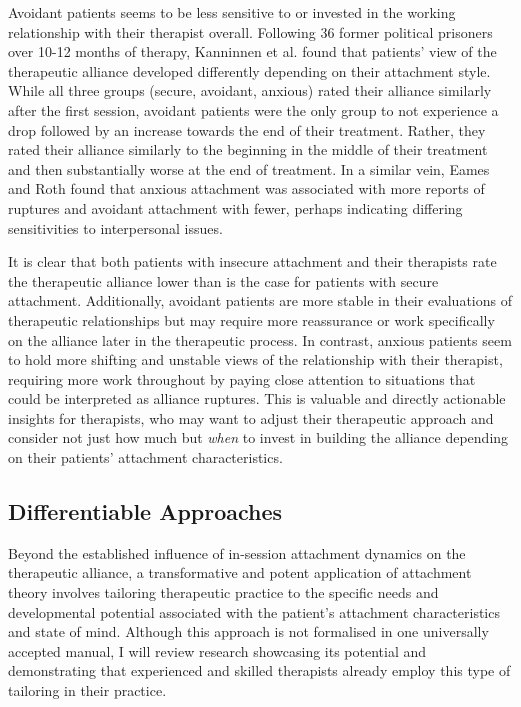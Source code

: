 \documentclass[12pt]{report}
\begin{document}
Avoidant patients seems to be less sensitive to or invested in the working relationship with their therapist overall.
Following 36 former political prisoners over 10-12 months of therapy, Kanninnen et al. \citeyear{Kanninen2000} found that patients' view of the therapeutic alliance developed differently depending on their attachment style.
While all three groups (secure, avoidant, anxious) rated their alliance similarly after the first session, avoidant patients were the only group to not experience a drop followed by an increase towards the end of their treatment.
Rather, they rated their alliance similarly to the beginning in the middle of their treatment and then substantially worse at the end of treatment.
In a similar vein, Eames and Roth \citeyear{Eames2000} found that anxious attachment was associated with more reports of ruptures and avoidant attachment with fewer, perhaps indicating differing sensitivities to interpersonal issues.

It is clear that both patients with insecure attachment and their therapists rate the therapeutic alliance lower than is the case for patients with secure attachment.
Additionally, avoidant patients are more stable in their evaluations of therapeutic relationships but may require more reassurance or work specifically on the alliance later in the therapeutic process.
In contrast, anxious patients seem to hold more shifting and unstable views of the relationship with their therapist, requiring more work throughout by paying close attention to situations that could be interpreted as alliance ruptures.
This is valuable and directly actionable insights for therapists, who may want to adjust their therapeutic approach and consider not just how much but \textit{when} to invest in building the alliance depending on their patients' attachment characteristics.

\subsection{Differentiable Approaches}
\label{sec:Differentiable approaches}
Beyond the established influence of in-session attachment dynamics on the therapeutic alliance, a transformative and potent application of attachment theory involves tailoring therapeutic practice to the specific needs and developmental potential associated with the patient's attachment characteristics and state of mind.
Although this approach is not formalised in one universally accepted manual, I will review research showcasing its potential and demonstrating that experienced and skilled therapists already employ this type of tailoring in their practice.
\end{document}
